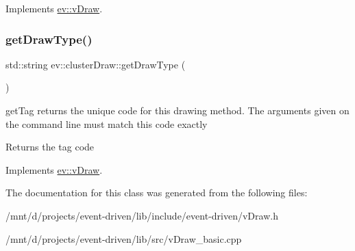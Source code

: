 Implements \hyperlink{classev_1_1vDraw_af1eee5dcdf3b4cfee6a3024e5cd706f8}{ev\+::v\+Draw}.

\mbox{\label{classev_1_1clusterDraw_a21cd4ba2277ad5258b39d135e445b32f}} 
\subsubsection{\texorpdfstring{get\+Draw\+Type()}{getDrawType()}}
{\footnotesize\ttfamily std\+::string ev\+::cluster\+Draw\+::get\+Draw\+Type (\begin{DoxyParamCaption}{ }\end{DoxyParamCaption})\hspace{0.3cm}{\ttfamily [virtual]}}



get\+Tag returns the unique code for this drawing method. The arguments given on the command line must match this code exactly 

\begin{DoxyReturn}{Returns}
the tag code 
\end{DoxyReturn}


Implements \hyperlink{classev_1_1vDraw_ac01381befeffef2b930cbceb28b18a28}{ev\+::v\+Draw}.



The documentation for this class was generated from the following files\+:\begin{DoxyCompactItemize}
\item 
/mnt/d/projects/event-\/driven/lib/include/event-\/driven/v\+Draw.\+h\item 
/mnt/d/projects/event-\/driven/lib/src/v\+Draw\+\_\+basic.\+cpp\end{DoxyCompactItemize}
